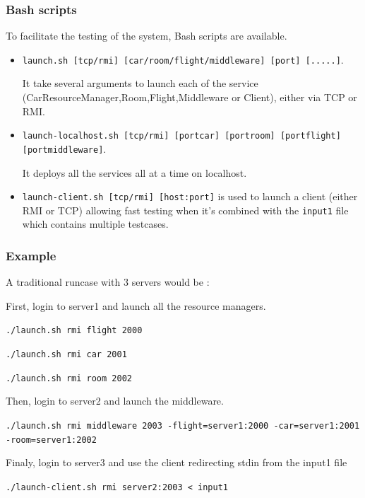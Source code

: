 \documentclass[a4paper]{article}
\begin{document}
\subsubsection{Bash scripts}
To facilitate the testing of the system, Bash scripts are available.
\begin{itemize}
\item{
{\tt launch.sh [tcp/rmi] [car/room/flight/middleware] [port] [.....]}.

It take several arguments to launch each of the service (CarResourceManager,Room,Flight,Middleware or Client), either via TCP or RMI.
}
\item{
{\tt launch-localhost.sh [tcp/rmi] [portcar] [portroom] [portflight] [portmiddleware]}.

It deploys all the services all at a time on localhost.
}
\item{
{\tt launch-client.sh [tcp/rmi] [host:port]} is used to launch a client (either RMI or TCP) 
allowing fast testing when it's combined with the {\tt input1} file which contains multiple testcases.
}
\end{itemize}

\subsubsection{Example}
A traditional runcase with 3 servers would be :

First, login to server1 and launch all the resource managers.

{\tt ./launch.sh rmi flight 2000}

{\tt ./launch.sh rmi car 2001}

{\tt ./launch.sh rmi room 2002}

Then, login to server2 and launch the middleware.

{\tt ./launch.sh rmi middleware 2003 -flight=server1:2000 -car=server1:2001 -room=server1:2002}

Finaly, login to server3 and use the client redirecting stdin from the input1 file
 
{\tt ./launch-client.sh rmi server2:2003 < input1}



%
%
\end{document}
